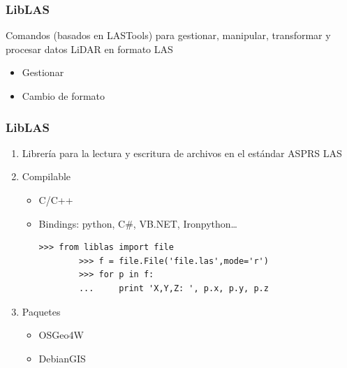 \begin{frame}[fragile]
  \frametitle{LibLAS}
  Comandos (basados en LASTools) para gestionar, manipular, 
    transformar y procesar datos LiDAR en formato LAS
    \begin{itemize}
      \item Gestionar
        \gestion
      \item Cambio de formato
        \formato
    \end{itemize}
\end{frame}
\begin{frame}[fragile]
  \frametitle{LibLAS}
  \begin{enumerate}
    \item Librería para la \alert{lectura} y \alert{escritura} de archivos en el estándar \alert{ASPRS LAS}
    \item Compilable
    \begin{itemize}
      \item C/C++
      \item Bindings: \alert{python}, C\#, VB.NET, Ironpython\ldots
    \begin{lstlisting}[style=mio]
        >>> from liblas import file
        >>> f = file.File('file.las',mode='r')
        >>> for p in f:
        ...     print 'X,Y,Z: ', p.x, p.y, p.z
    \end{lstlisting}
    \end{itemize}
    \item Paquetes
    \begin{itemize}
      \item \alert{OSGeo4W}
      \item DebianGIS
    \end{itemize}
  \end{enumerate}
\end{frame}




